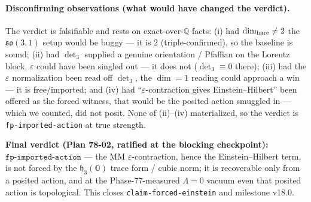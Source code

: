 \documentclass[11pt]{article}
\newcommand{\Q}{\mathbb{Q}}
\newcommand{\OO}{\mathbb{O}}
\newcommand{\so}{\mathfrak{so}}
\newcommand{\hh}{\mathfrak{h}}
\theoremstyle{definition}\newtheorem{remark}{Remark}
\theoremstyle{definition}\newtheorem{definition}{Definition}
\theoremstyle{plain}\newtheorem{proposition}{Proposition}
\theoremstyle{plain}\newtheorem{lemma}{Lemma}
\begin{document}
\paragraph{Disconfirming observations (what would have changed the verdict).} The
verdict is falsifiable and rests on exact-over-$\Q$ facts: (i) had $\dim_{\rm bare}\neq
2$ the $\so(3,1)$ setup would be buggy --- it is $2$ (triple-confirmed), so the baseline
is sound; (ii) had $\det\nolimits_3$ supplied a genuine orientation / Pfaffian on the
Lorentz block, $\varepsilon$ could have been singled out --- it does not
($\det\nolimits_3\equiv0$ there); (iii) had the $\varepsilon$ normalization been read off
$\det\nolimits_3$, the $\dim=1$ reading could approach a win --- it is free/imported; and
(iv) had ``$\varepsilon$-contraction gives Einstein--Hilbert'' been offered as the forced
witness, that would be the posited action smuggled in --- which we counted, did not
posit. None of (ii)--(iv) materialized, so the verdict is \texttt{fp-imported-action} at
true strength.

\medskip\noindent\textbf{Final verdict (Plan 78-02, ratified at the blocking
checkpoint):} $\boxed{\texttt{fp-imported-action}}$ --- the MM $\varepsilon$-contraction,
hence the Einstein--Hilbert term, is not forced by the $\hh_3(\OO)$ trace form / cubic
norm; it is recoverable only from a posited action, and at the Phase-77-measured
$\Lambda=0$ vacuum even that posited action is topological. This closes
\texttt{claim-forced-einstein} and milestone v18.0.
\end{document}
